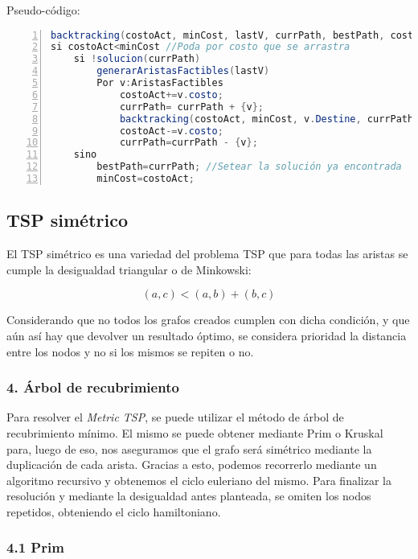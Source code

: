 Pseudo-código: 

\begin{lstlisting}[language=Java,numbers=left,numberstyle={\tiny},basicstyle={\footnotesize},breaklines=true,captionpos=t,frame=no,keywordstyle={\color{blue}},commentstyle={\color{gray}},stringstyle={\color{red}},numbersep=5pt,emph={label}]
backtracking(costoAct, minCost, lastV, currPath, bestPath, costoAct) 
si costoAct<minCost //Poda por costo que se arrastra 	
	si !solucion(currPath) 		
		generarAristasFactibles(lastV) 		
		Por v:AristasFactibles 			
			costoAct+=v.costo; 			
			currPath= currPath + {v}; 			
			backtracking(costoAct, minCost, v.Destine, currPath); 			
			costoAct-=v.costo; 			
			currPath=currPath - {v}; 	
	sino 		
		bestPath=currPath; //Setear la solución ya encontrada 		
		minCost=costoAct;
\end{lstlisting}



\subsection*{TSP simétrico }

El TSP simétrico es una variedad del problema TSP que para todas las
aristas se cumple la desigualdad triangular o de Minkowski: 

\[
(a,c)<(a,b)+(b,c)
\]


Considerando que no todos los grafos creados cumplen con dicha condición,
y que aún así hay que devolver un resultado óptimo, se considera prioridad
la distancia entre los nodos y no si los mismos se repiten o no.


\subsubsection*{4. Árbol de recubrimiento }

Para resolver el \emph{Metric TSP}, se puede utilizar el método de
árbol de recubrimiento mínimo. El mismo se puede obtener mediante
Prim o Kruskal para, luego de eso, nos aseguramos que el grafo será
simétrico mediante la duplicación de cada arista. Gracias a esto,
podemos recorrerlo mediante un algoritmo recursivo y obtenemos el
ciclo euleriano del mismo. Para finalizar la resolución y mediante
la desigualdad antes planteada, se omiten los nodos repetidos, obteniendo
el ciclo hamiltoniano.


\subsubsection*{4.1 Prim}

